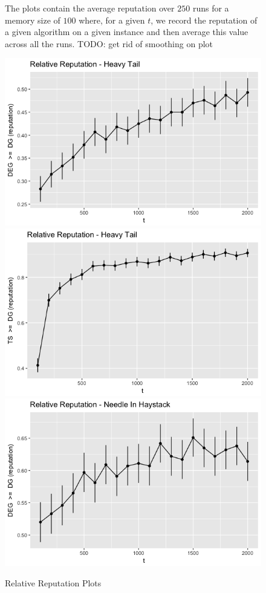 \documentclass{article}
\theoremstyle{definition}
\begin{document}
\begin{figure}
\label{prelim_means}
\caption*{\tiny{The plots contain the average reputation over $250$ runs for a memory size of $100$ where, for a given $t$, we record the reputation of a given algorithm on a given instance and then average this value across all the runs. TODO: get rid of smoothing on plot}}
\end{figure}

\begin{figure}
\caption{Relative Reputation Plots}
\includegraphics[scale=0.2]{"figures/deg_dg_ht_10_prelim"}
\includegraphics[scale=0.2]{"figures/ts_dg_ht_10_prelim"} \\
\includegraphics[scale=0.2]{"figures/deg_dg_nih_10_prelim"}

\end{figure}
\end{document}
